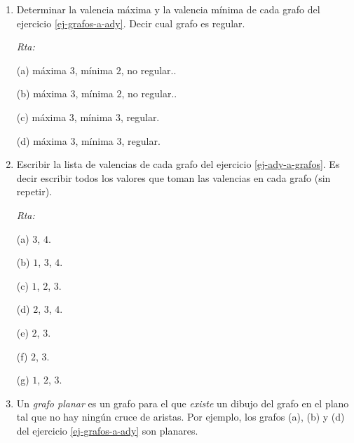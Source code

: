 \documentclass[a4paper,12pt,twoside,spanish,reqno]{amsbook}
\numberwithin{equation}{section}
\newcommand{\rta}{\noindent\textit{Rta: }}
\begin{document}
\begin{enumerate}
    
    \item Determinar la valencia máxima y la valencia mínima de cada grafo del ejercicio \ref{ej-grafos-a-ady}. Decir cual grafo es regular. 
    
    \rta 

    (a) máxima $3$, mínima $2$, no regular..

    (b) máxima $3$, mínima $2$, no regular..
    
    (c) máxima $3$, mínima $3$, regular.
    
    (d) máxima $3$, mínima $3$, regular.
    
    \item   Escribir la lista de valencias de cada grafo del ejercicio \ref{ej-ady-a-grafos}. Es decir escribir todos los valores que toman las valencias en cada grafo (sin repetir).

    \rta 

    (a) $3$, $4$.

    (b)  $1$, $3$, $4$.

    (c) $1$, $2$, $3$.

    (d) $2$, $3$, $4$.

    (e)  $2$, $3$.

    (f) $2$, $3$.

    (g)  $1$, $2$, $3$.

    \item Un  {\em grafo planar} es un grafo para el que  \textit{existe} un dibujo del grafo en el plano tal que no hay ningún cruce de aristas. Por ejemplo, los grafos (a), (b) y (d) del ejercicio \ref{ej-grafos-a-ady} son planares. 


\end{enumerate}
\end{document}
